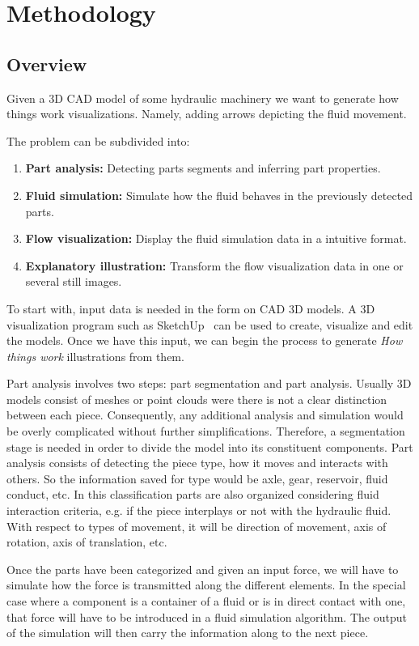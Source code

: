\chapter{Methodology}

\section{Overview}

Given a 3D CAD model of some hydraulic machinery we want to generate how things work visualizations.
Namely, adding arrows depicting the fluid movement.

The problem can be subdivided into:
\begin{enumerate}
\item \textbf{Part analysis:} Detecting parts segments and inferring part properties.
\item \textbf{Fluid simulation:} Simulate how the fluid behaves in the previously detected parts.
\item \textbf{Flow visualization:} Display the fluid simulation data in a intuitive format.
\item \textbf{Explanatory illustration:} Transform the flow visualization data in one or several still images.
\end{enumerate}

To start with, input data is needed in the form on CAD 3D models.
A 3D visualization program such as SketchUp~\cite{Trimble2014} can be used to create, visualize and edit the models.
Once we have this input, we can begin the process to generate \textit{How things work} illustrations from them.

Part analysis involves two steps: part segmentation and part analysis.
Usually 3D models consist of meshes or point clouds were there is not a clear distinction between each piece.
Consequently, any additional analysis and simulation would be overly complicated without further simplifications.  
Therefore, a segmentation stage is needed in order to divide the model into its constituent components.
Part analysis consists of detecting the piece type, how it moves and interacts with others.
So the information saved for type would be axle, gear, reservoir, fluid conduct, etc.
In this classification parts are also organized considering fluid interaction criteria, e.g. if the piece interplays or not with the hydraulic fluid.
With respect to types of movement, it will be direction of movement, axis of rotation, axis of translation, etc.

Once the parts have been categorized and given an input force, we will have to simulate how the force is transmitted along the different elements.
In the special case where a component is a container of a fluid or is in direct contact with one, that force will have to be introduced in a fluid simulation algorithm.
The output of the simulation will then carry the information along to the next piece.

